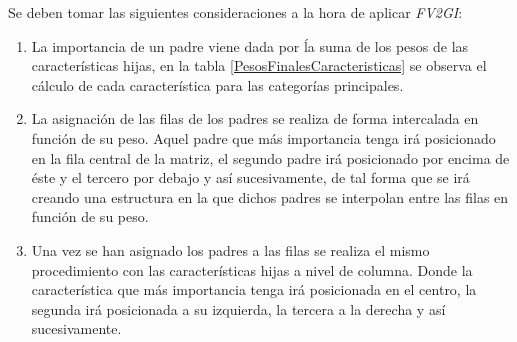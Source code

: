         Se deben tomar las siguientes consideraciones a la hora de aplicar \textit{FV2GI}:

        \begin{enumerate}

            \item La importancia de un padre viene dada por ĺa suma de los pesos de las características hijas, en la tabla \ref{PesosFinalesCaracteristicas} se observa el cálculo de cada característica para las categorías principales.

            \item La asignación de las filas de los padres se realiza de forma intercalada en función de su peso. Aquel padre que más importancia tenga irá posicionado en la fila central de la matriz, el segundo padre irá posicionado por encima de éste y el tercero por debajo y así sucesivamente, de tal forma que se irá creando una estructura en la que dichos padres se interpolan entre las filas en función de su peso.

            \item Una vez se han asignado los padres a las filas se realiza el mismo procedimiento con las características hijas a nivel de columna. Donde la característica que más importancia tenga irá posicionada en el centro, la segunda irá posicionada a su izquierda, la tercera a la derecha y así sucesivamente.
        \end{enumerate}



